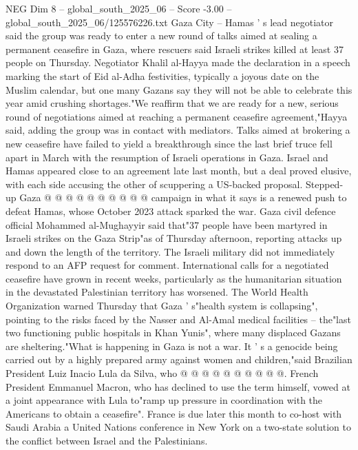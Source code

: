 \begin{textsample}{NEG Dim 8 – global\_south\_2025\_06 – Score -3.00 – global\_south\_2025\_06/125576226.txt}  \label{ex:f8_neg_033}
Gaza City -- Hamas ' s lead negotiator said the group was ready to enter a new round of talks aimed at sealing a permanent ceasefire in Gaza, where rescuers said Israeli strikes killed at least 37 people on Thursday.
Negotiator Khalil al-Hayya made the declaration in a speech marking the start of Eid al-Adha festivities, typically a joyous date on the Muslim calendar, but one many Gazans say they will not be able to celebrate this year amid crushing shortages."We reaffirm that we are ready for a new, serious round of negotiations aimed at reaching a permanent ceasefire agreement,"Hayya said, adding the group was in contact with mediators.
Talks aimed at brokering a new ceasefire have failed to yield a breakthrough since the last brief truce fell apart in March with the resumption of Israeli operations in Gaza.
Israel and Hamas appeared close to an agreement late last month, but a deal proved elusive, with each side accusing the other of scuppering a US-backed proposal.
Stepped-up Gaza @ @ @ @ @ @ @ @ @ @ campaign in what it says is a renewed push to defeat Hamas, whose October 2023 attack sparked the war.
Gaza civil defence official Mohammed al-Mughayyir said that"37 people have been martyred in Israeli strikes on the Gaza Strip"as of Thursday afternoon, reporting attacks up and down the length of the territory.
The Israeli military did not immediately respond to an AFP request for comment.
International calls for a negotiated ceasefire have grown in recent weeks, particularly as the humanitarian situation in the devastated Palestinian territory has worsened.
The World Health Organization warned Thursday that Gaza ' s"health system is collapsing", pointing to the risks faced by the Nasser and Al-Amal medical facilities -- the"last two functioning public hospitals in Khan Yunis", where many displaced Gazans are sheltering."What is happening in Gaza is not a war.
It ' s a genocide being carried out by a highly prepared army against women and children,"said Brazilian President Luiz Inacio Lula da Silva, who @ @ @ @ @ @ @ @ @ @.
French President Emmanuel Macron, who has declined to use the term himself, vowed at a joint appearance with Lula to"ramp up pressure in coordination with the Americans to obtain a ceasefire".
France is due later this month to co-host with Saudi Arabia a United Nations conference in New York on a two-state solution to the conflict between Israel and the Palestinians.

\end{textsample}

